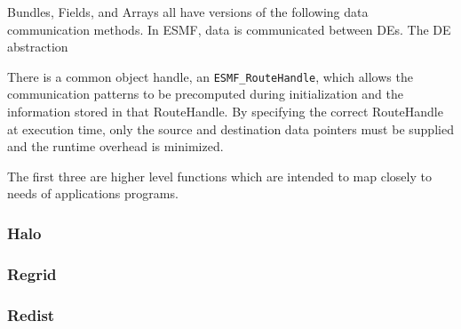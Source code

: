 Bundles, Fields, and Arrays all have versions of the following
data communication methods.  In ESMF, data is communicated 
between DEs.  The DE abstraction

There is a common object handle, an {\tt ESMF\_RouteHandle}, which
allows the communication patterns to be precomputed during 
initialization and the information stored in that RouteHandle.
By specifying the correct RouteHandle at execution time, only
the source and destination data pointers must be supplied and the
runtime overhead is minimized.

The first three are higher level functions which are intended to
map closely to needs of applications programs.


\subsubsection{Halo}


\subsubsection{Regrid}



\subsubsection{Redist}


